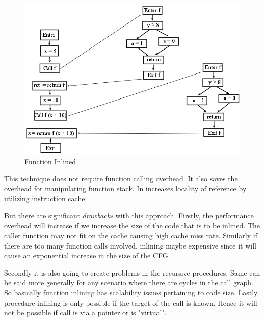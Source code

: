 \documentclass[12pt,oneside]{book}
\begin{document}
\begin{figure}[htbp]
\centering
\includegraphics[scale=0.5]{inlineCFG.png}
\caption{Function Inlined}
\end{figure}

This technique does not require function calling overhead. It also saves the overhead for manipulating function stack. In increases locality of reference by utilizing instruction cache.

But there are significant \textit{drawbacks} with this approach. Firstly, the performance overhead will increase if we increase the size of the code that is to be inlined. The caller function may not fit on the cache causing high cache miss rate. Similarly if there are too many function calls involved, inlining maybe expensive since it will cause an exponential increase in the size of the CFG.

Secondly it is also going to create problems in the recursive procedures. Same can be said more generally for any scenario where there are cycles in the call graph. So basically function inlining has scalability issues pertaining to code size. Lastly, procedure inlining is only possible if the target of the call is known. Hence it will not be possible if call is via a pointer or is "virtual".

\end{document}
